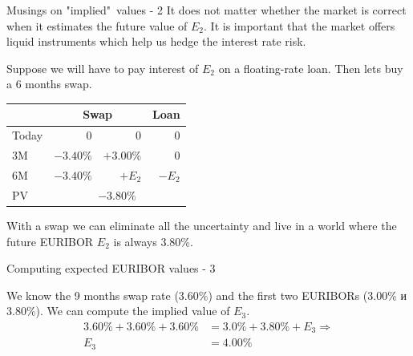 \documentclass{beamer}
\begin{document}
\begin{frame}{Musings on "implied"\ values - 2}
\justify
It does not matter whether the market is correct when it estimates the future value of $E_2$. It is important that the market offers liquid instruments which help us hedge the interest rate risk.

\justify
Suppose we will have to pay interest of $E_2$ on  a floating-rate loan. Then lets buy a 6 months swap.

\centering
\begin{tabular}{l|r|r|r}
    & \multicolumn{2}{c|}{Swap} & Loan \\ \hline
Today &          0  &  0            & 0 \\
3M      & $-3.40\%$  &  $+3.00\%$   & 0 \\
6M      & $-3.40\%$  &  $+E_2$       & $-E_2$ \\ \hline
PV       & \multicolumn{3}{c}{$-3.80\%$}
\end{tabular}

\justify
With a swap we can eliminate all the uncertainty and live in a world where the future EURIBOR $E_2$ is always 3.80\%.
\end{frame}



\begin{frame}{Computing expected EURIBOR values - 3}
\centering
{}

\justify
We know the 9 months swap rate (3.60\%) and the first two EURIBORs (3.00\% и 3.80\%). We can compute the implied value of $E_3$.
\begin{align*}
3.60\% + 3.60\% + 3.60\% &= 3.0\% + 3.80\% + E_3 \Rightarrow \\
E_3 &= 4.00\%
\end{align*}
\end{frame}
\end{document}
